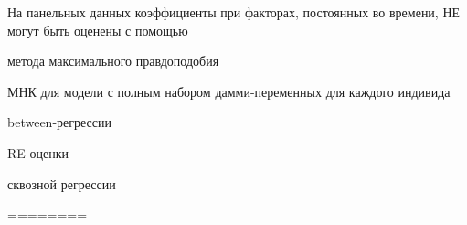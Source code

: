 
\begin{question}
На панельных данных коэффициенты при факторах, постоянных во времени, НЕ
могут быть оценены с помощью
\begin{answerlist}[2]
  \item метода максимального правдоподобия
  \item МНК для модели с полным набором дамми-переменных для каждого индивида
  \item between-регрессии
  \item RE-оценки
  \item сквозной регрессии
\end{answerlist}
\end{question}

\begin{solution}
========
\end{solution}

